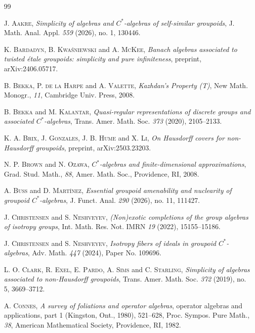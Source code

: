 \documentclass[11pt, oneside, reqno]{amsart}
\theoremstyle{definition}
\theoremstyle{remark}
\numberwithin{equation}{section}
\begin{document}
\begin{thebibliography}{99}

 J. \textsc{Aakre}, \emph{Simplicity of algebras and $C^*$-algebras of self-similar groupoids}, J. Math. Anal. Appl. \emph{559} (2026), no. 1, 130446.

 K. \textsc{Bardadyn}, B. \textsc{Kwaśniewski} and A. \textsc{McKee}, \emph{Banach algebras associated to twisted \'etale groupoids: simplicity and pure infiniteness}, preprint, arXiv:2406.05717.

 B. \textsc{Bekka}, P. \textsc{de la Harpe} and A. \textsc{Valette}, \emph{Kazhdan’s Property (T)}, 
    New Math. Monogr., \emph{11},  Cambridge Univ. Press, 2008.

 B. \textsc{Bekka} and M. \textsc{Kalantar}, \emph{Quasi-regular representations of discrete groups and associated $C^*$-algebras}, Trans. Amer. Math. Soc. \emph{373} (2020), 2105--2133.


 K. A. \textsc{Brix}, J. \textsc{Gonzales}, J. B. \textsc{Hume} and X. \textsc{Li}, \emph{On Hausdorff covers for non-Hausdorff groupoids}, preprint, arXiv:2503.23203.

 N. P. \textsc{Brown} and N. \textsc{Ozawa}, \emph{$C^*$-algebras and finite-dimensional approximations}, Grad. Stud. Math., \emph{88}, Amer. Math. Soc., Providence, RI, 2008.

 A. \textsc{Buss} and D. \textsc{Mart{\'i}nez}, \emph{Essential groupoid amenability and nuclearity of groupoid $C^*$-algebras}, J. Funct. Anal. \emph{290} (2026), no. 11, 111427.


 J. \textsc{Christensen} and S. \textsc{Neshveyev}, \emph{(Non)exotic completions of the group algebras of isotropy groups},
Int. Math. Res. Not. IMRN \emph{19} (2022), 15155--15186.

 J. \textsc{Christensen} and S. \textsc{Neshveyev}, \emph{Isotropy fibers of ideals in groupoid $C^*$-algebras}, Adv. Math. \emph{447} (2024), Paper No. 109696.

 L. O. \textsc{Clark}, R. \textsc{Exel}, E. \textsc{Pardo}, A. \textsc{Sims} and C. \textsc{Starling}, \emph{Simplicity of algebras associated to non-Hausdorff groupoids}, Trans. Amer. Math. Soc. \emph{372} (2019), no. 5, 3669--3712.

 A. \textsc{Connes}, \emph{A survey of foliations and operator algebras}, operator algebras and applications, part 1 (Kingston, Ont., 1980),  521--628, Proc. Sympos. Pure Math., \emph{38}, American Mathematical Society, Providence, RI, 1982.


\end{thebibliography}
\end{document}
